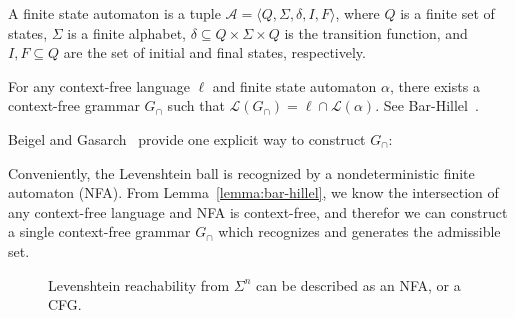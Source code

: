 \documentclass[sigplan,review,anonymous,acmsmall]{acmart}\settopmatter{printfolios=false,printccs=false,printacmref=false}
\begin{document}
  \begin{definition}
    A finite state automaton is a tuple $\mathcal{A} = \langle Q, \Sigma, \delta, I, F\rangle$, where $Q$ is a finite set of states, $\Sigma$ is a finite alphabet, $\delta \subseteq Q \times \Sigma \times Q$ is the transition function, and $I, F \subseteq Q$ are the set of initial and final states, respectively.
  \end{definition}

  \begin{lemma}\label{lemma:bar-hillel}
  For any context-free language $\ell$ and finite state automaton $\alpha$, there exists a context-free grammar $G_\cap$ such that $\mathcal{L}(G_\cap) = \ell \cap \mathcal{L}(\alpha)$. See Bar-Hillel~\cite{bar1961formal}.
  \end{lemma}

  \pagebreak \noindent Beigel and Gasarch~\cite{beigelproof} provide one explicit way to construct $G_\cap$:


  Conveniently, the Levenshtein ball is recognized by a nondeterministic finite automaton (NFA). From Lemma~\ref{lemma:bar-hillel}, we know the intersection of any context-free language and NFA is context-free, and therefor we can construct a single context-free grammar $G_\cap$ which recognizes and generates the admissible set.

  \begin{figure}[H]
    \begin{center}
      \resizebox{.9\textwidth}{!}{}
    \end{center}
    \caption{Levenshtein reachability from $\Sigma^n$ can be described as an NFA, or a CFG.}
  \end{figure}
\end{document}
